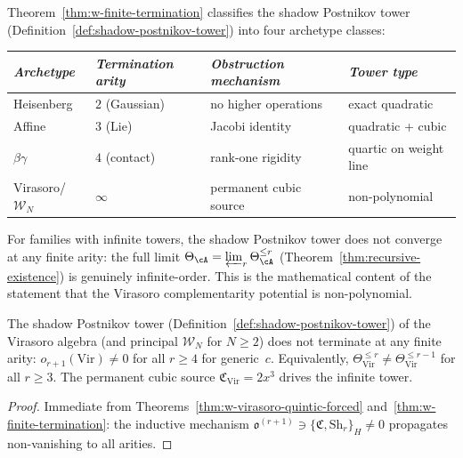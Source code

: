 \begin{remark}
\label{rem:w-postnikov-interpretation}
Theorem~\ref{thm:w-finite-termination} classifies the
shadow Postnikov tower
(Definition~\ref{def:shadow-postnikov-tower}) into
four archetype classes:
\begin{center}
\small
\renewcommand{\arraystretch}{1.15}
\begin{tabular}{llll}
\toprule
\emph{Archetype} & \emph{Termination arity} &
\emph{Obstruction mechanism} & \emph{Tower type} \\
\midrule
Heisenberg & $2$ (Gaussian) & no higher operations &
exact quadratic \\
Affine & $3$ (Lie) & Jacobi identity &
quadratic + cubic \\
$\beta\gamma$ & $4$ (contact) & rank-one rigidity &
quartic on weight line \\
Virasoro/$\mathcal{W}_N$ & $\infty$ & permanent cubic source &
non-polynomial \\
\bottomrule
\end{tabular}
\end{center}
For families with infinite towers, the shadow Postnikov
tower does not converge at any finite arity: the full
limit $\Theta_\cA = \varprojlim_r
\Theta_\cA^{\leq r}$
(Theorem~\ref{thm:recursive-existence}) is genuinely
infinite-order.  This is the mathematical content of the
statement that the Virasoro complementarity potential is
non-polynomial.
\end{remark}

\begin{corollary}
\label{cor:virasoro-postnikov-nontermination}
The shadow Postnikov tower
\textup{(}Definition~\textup{\ref{def:shadow-postnikov-tower})}
of the Virasoro algebra \textup{(}and principal
$\mathcal{W}_N$ for $N \geq 2$\textup{)} does not terminate at
any finite arity:
$o_{r+1}(\mathrm{Vir}) \neq 0$ for all $r \geq 4$ for
generic~$c$.
Equivalently, $\Theta_{\mathrm{Vir}}^{\leq r} \neq
\Theta_{\mathrm{Vir}}^{\leq r-1}$ for all $r \geq 3$.
The permanent cubic source $\mathfrak{C}_{\mathrm{Vir}} = 2x^3$
drives the infinite tower.
\end{corollary}

\begin{proof}
Immediate from Theorems~\ref{thm:w-virasoro-quintic-forced}
and~\ref{thm:w-finite-termination}: the inductive mechanism
$\mathfrak{o}^{(r+1)} \ni
\{\mathfrak{C},\mathrm{Sh}_r\}_H \neq 0$
propagates non-vanishing to all arities.
\end{proof}

